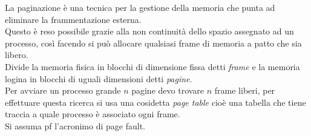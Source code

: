 \documentclass{article}
\begin{document}
    La paginazione è una tecnica per la gestione della memoria che punta ad eliminare la frammentazione esterna.\\
    Questo è reso possibile grazie alla non continuità dello spazio assegnato ad un processo, così facendo si può allocare qualsiasi frame di memoria a patto che sia libero.\\
    Divide la memoria fisica in blocchi di dimensione fissa detti \emph{frame} e la memoria logina in blocchi di uguali dimensioni detti \emph{pagine}.\\
    Per avviare un processo grande $n$ pagine devo trovare $n$ frame liberi, per effettuare questa ricerca si usa una cosidetta \emph{page table} cioè una tabella che tiene traccia a quale processo è associato ogni frame.\\
    Si assuma pf l'acronimo di page fault.
\end{document}
